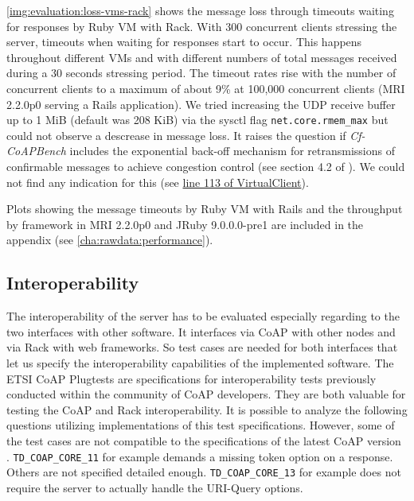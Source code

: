 		\autoref{img:evaluation:loss-vms-rack} shows the message loss through
		timeouts waiting for responses by Ruby \ac{VM} with Rack. With 300
		concurrent clients stressing the server, timeouts when waiting
		for responses start to occur. This happens throughout different
		\acp{VM} and with different numbers of total messages received during a
		30 seconds stressing period. The timeout rates rise with the number of
		concurrent clients to a maximum of about 9\% at 100,000 concurrent
		clients (\ac{MRI} 2.2.0p0 serving a \ac{Rails} application). We tried
		increasing the \ac{UDP} receive buffer up to 1 MiB (default was 208
		KiB) via the sysctl flag \texttt{net.core.rmem\_max} but could not
		observe a descrease in message loss. It raises the question if
		\emph{Cf-CoAPBench} includes the exponential back-off mechanism for
		retransmissions of confirmable messages to achieve congestion control
		(see section 4.2 of \cite{coap}). We could not find any indication for
		this (see
		\href{https://github.com/eclipse/californium.tools/blob/1.0.0-M3/cf-coapbench/src/main/java/org/eclipse/californium/tools/coapbench/VirtualClient.java#L113}{line
		113 of VirtualClient}).

		Plots showing the message timeouts by Ruby \ac{VM} with \ac{Rails} and
		the throughput by framework in \ac{MRI} 2.2.0p0 and JRuby 9.0.0.0-pre1
		are included in the appendix (see \autoref{cha:rawdata:performance}).

	\subsection{Interoperability}
	\label{cha:evaluation:interoperability}

		The interoperability of the server has to be evaluated especially
		regarding to the two interfaces with other software. It interfaces via
		\ac{CoAP} with other nodes and via Rack with web frameworks. So test
		cases are needed for both interfaces that let us specify the
		interoperability capabilities of the implemented software. The
		\ac{ETSI} \ac{CoAP} Plugtests \cite{etsi-plugtests} are specifications
		for interoperability tests previously conducted within the community of
		\ac{CoAP} developers. They are both valuable for testing the \ac{CoAP}
		and Rack interoperability. It is possible to analyze the following
		questions utilizing implementations of this test specifications.
		However, some of the test cases are not compatible to the
		specifications of the latest \ac{CoAP} version \cite{coap}.
		\texttt{TD\_COAP\_CORE\_11} for example demands a missing token option
		on a response. Others are not specified detailed enough.
		\texttt{TD\_COAP\_CORE\_13} for example does not require the server to
		actually handle the \ac{URI}-Query options.

